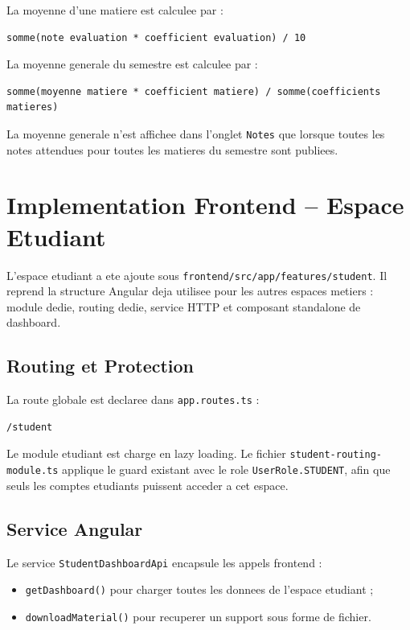\documentclass[12pt,a4paper]{report}
\begin{document}
La moyenne d'une matiere est calculee par :

\begin{verbatim}
somme(note evaluation * coefficient evaluation) / 10
\end{verbatim}

La moyenne generale du semestre est calculee par :

\begin{verbatim}
somme(moyenne matiere * coefficient matiere) / somme(coefficients matieres)
\end{verbatim}

La moyenne generale n'est affichee dans l'onglet \texttt{Notes} que lorsque toutes les notes attendues pour toutes les matieres du semestre sont publiees.

\section{Implementation Frontend -- Espace Etudiant}

L'espace etudiant a ete ajoute sous \texttt{frontend/src/app/features/student}. Il reprend la structure Angular deja utilisee pour les autres espaces metiers : module dedie, routing dedie, service HTTP et composant standalone de dashboard.

\subsection{Routing et Protection}

La route globale est declaree dans \texttt{app.routes.ts} :

\begin{verbatim}
/student
\end{verbatim}

Le module etudiant est charge en lazy loading. Le fichier \texttt{student-routing-module.ts} applique le guard existant avec le role \texttt{UserRole.STUDENT}, afin que seuls les comptes etudiants puissent acceder a cet espace.

\subsection{Service Angular}

Le service \texttt{StudentDashboardApi} encapsule les appels frontend :

\begin{itemize}[itemsep=0.3em]
    \item \texttt{getDashboard()} pour charger toutes les donnees de l'espace etudiant ;
    \item \texttt{downloadMaterial()} pour recuperer un support sous forme de fichier.
\end{itemize}
\end{document}
